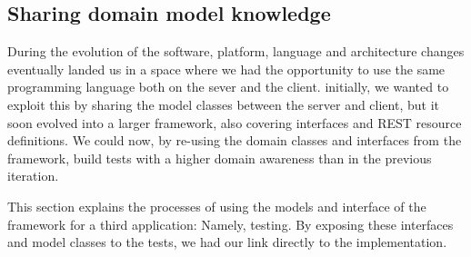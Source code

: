 \subsection{Sharing domain model knowledge}
\label{ssec:openreception-framework}
During the evolution of the software, platform, language and architecture changes eventually landed us in a space where we had the opportunity to use the same programming language both on the sever and the client. initially, we wanted to exploit this by sharing the model classes between the server and client, but it soon evolved into a larger framework, also covering interfaces and REST resource definitions. We could now, by re-using the domain classes and interfaces from the framework, build tests with a higher domain awareness than in the previous iteration.\medskip

\noindent This section explains the processes of using the models and interface of the framework for a third application: Namely, testing. By exposing these interfaces and model classes to the tests, we had our link directly to the implementation.

